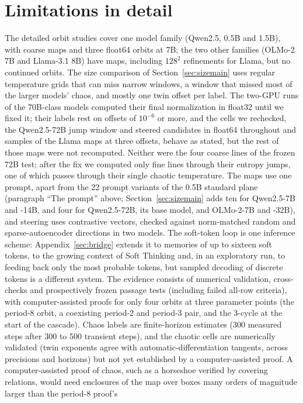 \documentclass[11pt,letterpaper]{article}
\begin{document}
\section{Limitations in detail}
\label{sec:limits}
The detailed orbit studies cover one model family (Qwen2.5, 0.5B and 1.5B), with coarse
maps and three float64 orbits at 7B; the two other families (OLMo-2 7B and Llama-3.1 8B) have maps, including
$128^2$ refinements for Llama, but no continued orbits. The size comparison of Section~\ref{sec:sizemain} uses regular
temperature grids that can miss narrow windows, a window that missed most of the larger models' chaos, and mostly
one twin offset per label. The two-GPU runs of the 70B-class models computed their final normalization in float32
until we fixed it; their labels rest on offsets of $10^{-6}$ or more, and the cells we rechecked, the Qwen2.5-72B jump
window and steered candidates in float64 throughout and samples of the Llama maps at three offsets, behave as stated,
but the rest of those maps were not recomputed. Neither were the four coarse lines of the frozen 72B test; after the
fix we computed only fine lines through their entropy jumps, one of which passes through their single chaotic
temperature.
The maps use one prompt, apart from the 22 prompt variants of the 0.5B standard plane (paragraph ``The prompt''
above; Section~\ref{sec:sizemain} adds ten for Qwen2.5-7B and -14B, and four for Qwen2.5-72B, its base
model, and OLMo-2-7B and -32B), and steering uses contrastive vectors, checked against norm-matched random and sparse-autoencoder
directions in two models. The soft-token loop is one inference scheme: Appendix~\ref{sec:bridge} extends it to memories of up to sixteen soft tokens, to the growing context of Soft Thinking and, in an exploratory run, to feeding back only the most probable tokens, but sampled decoding of discrete tokens is a different system. The evidence consists of numerical
validation, cross-checks and prospectively frozen passage tests (including failed all-row criteria), with
computer-assisted proofs for only four orbits at three parameter points (the period-8 orbit, a coexisting period-2
and period-3 pair, and the 3-cycle at the start of the cascade). Chaos labels are finite-horizon estimates (300
measured steps after 300 to 500 transient steps), and the chaotic cells are numerically validated (twin exponents agree with automatic-differentiation tangents, across precisions and horizons) but not yet established by a computer-assisted proof. A computer-assisted proof of chaos, such as a horseshoe verified by covering
relations, would need enclosures of the map over boxes many orders of magnitude larger than the period-8 proof's
\end{document}
